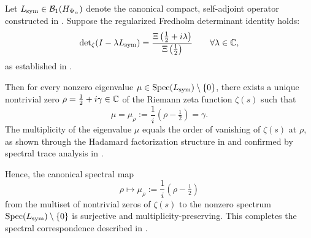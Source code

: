 \begin{lemma}
\label{lem:spectral_exhaustivity}
Let \( L_{\mathrm{sym}} \in \mathcal{B}_1(H_{\Psi_\alpha}) \) denote the canonical compact, self-adjoint operator constructed in . Suppose the regularized Fredholm determinant identity holds:
\[
\det\nolimits_{\zeta}(I - \lambda L_{\mathrm{sym}}) = \frac{\Xi\left(\tfrac{1}{2} + i\lambda\right)}{\Xi\left(\tfrac{1}{2}\right)} \qquad \forall \lambda \in \mathbb{C},
\]
as established in .

Then for every nonzero eigenvalue \( \mu \in \operatorname{Spec}(L_{\mathrm{sym}}) \setminus \{0\} \), there exists a unique nontrivial zero \( \rho = \tfrac{1}{2} + i\gamma \in \mathbb{C} \) of the Riemann zeta function \( \zeta(s) \) such that
\[
\mu = \mu_\rho := \frac{1}{i}(\rho - \tfrac{1}{2}) = \gamma.
\]
The multiplicity of the eigenvalue \( \mu \) equals the order of vanishing of \( \zeta(s) \) at \( \rho \), as shown through the Hadamard factorization structure in  and confirmed by spectral trace analysis in .

\medskip
\noindent
Hence, the canonical spectral map
\[
\rho \longmapsto \mu_\rho := \frac{1}{i}(\rho - \tfrac{1}{2})
\]
from the multiset of nontrivial zeros of \( \zeta(s) \) to the nonzero spectrum \( \operatorname{Spec}(L_{\mathrm{sym}}) \setminus \{0\} \) is surjective and multiplicity-preserving. This completes the spectral correspondence described in .
\end{lemma}

